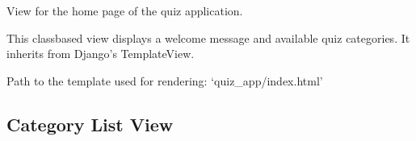 \documentclass[letterpaper,10pt,english]{sphinxmanual}
\begin{document}
\begin{fulllineitems}
\label{\detokenize{views:IndexView}}
\pysigstartsignatures
{}
\pysigstopsignatures
\sphinxAtStartPar
View for the home page of the quiz application.

\sphinxAtStartPar
This class\sphinxhyphen{}based view displays a welcome message and available quiz categories.
It inherits from Django’s TemplateView.

\begin{fulllineitems}
\label{\detokenize{views:IndexView.template_name}}
\pysigstartsignatures
{}
\pysigstopsignatures
\sphinxAtStartPar
Path to the template used for rendering: ‘quiz\_app/index.html’

\end{fulllineitems}


\end{fulllineitems}



\subsection{Category List View}
\label{\detokenize{views:category-list-view}}
\end{document}
